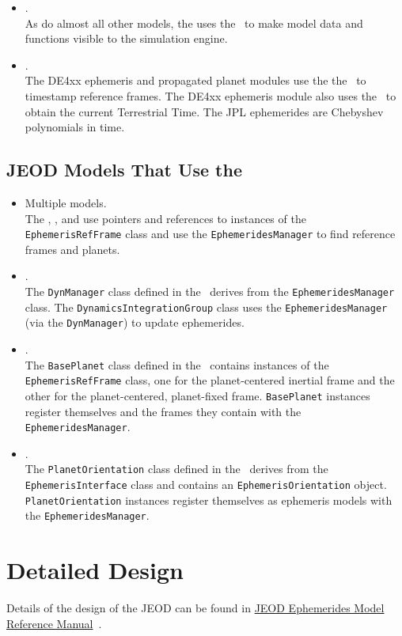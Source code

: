 \begin{itemize}
\item{}.\\
As do almost all other models,
the \ModelDesc uses the \SIMINTERFACE\ to make model data and functions
visible to the simulation engine.

\item{}.\\
The DE4xx ephemeris and propagated planet modules use the the \TIME\ to
timestamp reference frames.
The DE4xx ephemeris module also uses the \TIME\ to obtain the current
Terrestrial Time. The JPL ephemerides are Chebyshev polynomials in time.
\end{itemize}

\subsection{JEOD Models That Use the \ModelDesc}
\begin{itemize}
\item Multiple models.\\
The , , and
 use pointers and references to
instances of the \texttt{EphemerisRefFrame} class and
use the \texttt{EphemeridesManager} to find reference frames
and planets.

\item{}.\\
The \texttt{DynManager} class defined in the \DYNMANAGER\ derives from the
\texttt{EphemeridesManager} class.
The \texttt{DynamicsIntegrationGroup} class uses the
\texttt{EphemeridesManager} (via the \texttt{DynManager})
to update ephemerides.

\item{}.\\
The \texttt{BasePlanet} class defined in the \PLANET\ contains
instances of the \texttt{EphemerisRefFrame} class, one for the
planet-centered inertial frame and the other for the planet-centered,
planet-fixed frame. \texttt{BasePlanet} instances register themselves
and the frames they contain with the \texttt{EphemeridesManager}.

\item{}.\\
The \texttt{PlanetOrientation} class defined in the \RNP\ derives from
the \texttt{EphemerisInterface} class and contains an
\texttt{EphemerisOrientation} object. \texttt{PlanetOrientation}
instances register themselves as ephemeris models with
the \texttt{EphemeridesManager}.
\end{itemize}


\section{Detailed Design}
Details of the design of the JEOD \ModelDesc can be found in
\hyperref{file:refman.pdf}{}{}
{JEOD Ephemerides Model Reference Manual}~\cite{ephemerides_refman}.

\clearpage
\boilerplateinventory
